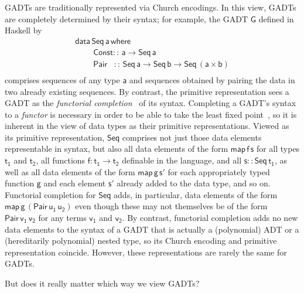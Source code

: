 \documentclass[acmsmall,screen,review,anonymous]{acmart}
\theoremstyle{definition}
\begin{document}
GADTs are traditionally represented via Church encodings. In this
view, GADTs are completely determined by their syntax; for example,
the GADT $\mathsf{G}$ defined in Haskell by
\begin{equation}\label{eq:example-GADT}
\begin{array}{l}
\mathsf{data\, Seq\,a\,where}\\
\mathsf{\;\;\;\;\;\;\;\;Const ::\, a \to Seq\,a}\\
\mathsf{\;\;\;\;\;\;\;\;Pair\,\,\,\,\, ::\, Seq \,a \to Seq\,b \to
  Seq\,(a \times b)}\\ 
\end{array}
\end{equation}
\noindent
comprises sequences of any type $\mathsf{a}$ and sequences obtained by
pairing the data in two already existing sequences. By contrast, the
primitive representation sees a GADT as the {\em functorial
  completion}~\cite{jp19} of its syntax. Completing a GADT's syntax to
a {\em functor} is necessary in order to be able to take the least
fixed point~\cite{tfca}, so it is inherent in the view of data types
as their primitive representations. Viewed as its primitive
representation, $\mathsf{Seq}$ comprises not just those data elements
representable in syntax, but also all data elements of the form
$\mathsf{map\,f\,s}$ for all types $\mathsf{t_1}$ and $\mathsf{t_2}$,
all functions $\mathsf{f : t_1 \to t_2}$ definable in the language,
and all $\mathsf{s :: Seq\,t_1}$, as well as all data elements of the
form $\mathsf{map\,g\,s'}$ for each appropriately typed function
$\mathsf{g}$ and each element $\mathsf{s'}$ already added to the data
type, and so on. Functorial completion for $\mathsf{Seq}$ adds, in
particular, data elements of the form
$\mathsf{map\,g\,(Pair\,u_1\,u_2)}$ even though these may not
themselves be of the form $\mathsf{Pair\,v_1\,v_2}$ for any terms
$\mathsf{v_1}$ and $\mathsf{v_2}$. By contrast, functorial completion
adds no new data elements to the syntax of a GADT that is actually a
(polynomial) ADT or a (hereditarily polynomial) nested type, so its
Church encoding and primitive representation coincide. However, these
representations are rarely the same for GADTs.

But does it really matter which way we view GADTs?
\end{document}

